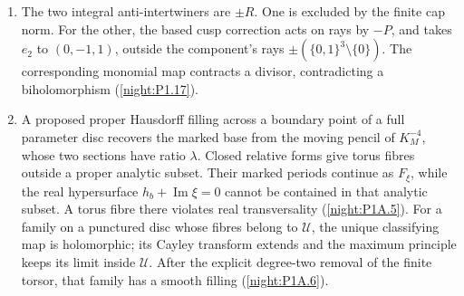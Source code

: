 \begin{enumerate}[label=\arabic*.,leftmargin=*]
\item\hypertarget{step-V-E-5}{} The two integral anti-intertwiners are $\pm R$.  One is excluded
  by the finite cap norm.  For the other, the based cusp
  correction acts on rays by $-P$, and takes $e_2$ to $(0,-1,1)$,
  outside the component's rays $\pm(\{0,1\}^3\setminus\{0\})$.
  The corresponding monomial map contracts a divisor, contradicting
  a biholomorphism (\cref{night:P1.17}).

\item\hypertarget{step-V-E-6}{} A proposed proper Hausdorff filling across a boundary point of
  a full parameter disc recovers the marked base from the moving
  pencil of $K_M^{-4}$, whose two sections have ratio $\lambda$.
  Closed relative forms give torus fibres outside a proper
  analytic subset.  Their marked periods continue as $F_\xi$,
  while the real hypersurface $h_b+\operatorname{Im}\xi=0$
  cannot be contained in that analytic subset.  A torus fibre
  there violates real transversality (\cref{night:P1A.5}).  For a family on a punctured disc whose
  fibres belong to $\mathcal U$, the unique classifying map is
  holomorphic; its Cayley transform extends and the maximum principle
  keeps its limit inside $\mathcal U$.  After the explicit degree-two
  removal of the finite torsor, that family has a smooth filling
  (\cref{night:P1A.6}).

\end{enumerate}

\hypertarget{outline-V-C}{}
